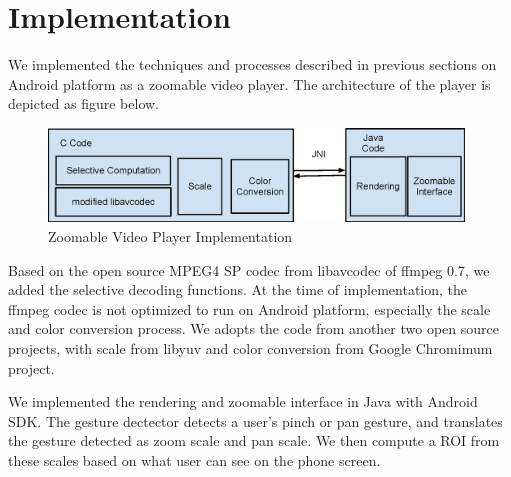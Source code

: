 \section{Implementation}
We implemented the techniques and processes described in previous sections on Android platform\cite{webandroid} as a zoomable video player. The architecture of the player is depicted as figure below.
\begin{figure}
\centering
\includegraphics[height=2.5cm]{player.eps}
\caption{Zoomable Video Player Implementation}
\end{figure}
Based on the open source MPEG4 SP codec from libavcodec of ffmpeg 0.7\cite{webffmpeg}, we added the selective decoding functions. At the time of implementation, the ffmpeg codec is not optimized to run on Android platform, especially the scale and color conversion process. We adopts the code from another two open source projects, with scale from libyuv\cite{weblibyuv} and color conversion from Google Chromimum project\cite{webchromium}. 

We implemented the rendering and zoomable interface in Java with Android SDK. The gesture dectector detects a user's pinch or pan gesture, and translates the gesture detected as zoom scale and pan scale. We then compute a ROI from these scales based on what user can see on the phone screen. 
